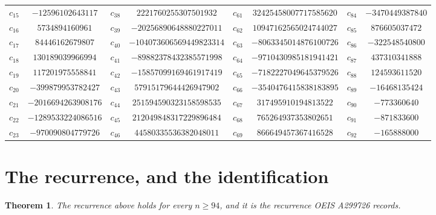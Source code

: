 \documentclass[11pt,a4paper]{article}
\theoremstyle{plain}
\newtheorem{theorem}{Theorem}
\theoremstyle{definition}
\begin{document}
\begin{center}
\begin{tabular}{cccccccc}
$c_{15}$ & $-12596102643117$ & $c_{38}$ & $2221760255307501932$ & $c_{61}$ & $32425458007717585620$ & $c_{84}$ & $-3470449387840$ \\
$c_{16}$ & $5734894160961$ & $c_{39}$ & $-20256890648880227011$ & $c_{62}$ & $10947162565024744027$ & $c_{85}$ & $876605037472$ \\
$c_{17}$ & $84446162679807$ & $c_{40}$ & $-104073606569449823314$ & $c_{63}$ & $-8063345014876100726$ & $c_{86}$ & $-322548540800$ \\
$c_{18}$ & $130189039966994$ & $c_{41}$ & $-89882378432385571998$ & $c_{64}$ & $-9710430985181941421$ & $c_{87}$ & $437310341888$ \\
$c_{19}$ & $117201975558841$ & $c_{42}$ & $-15857099169461917419$ & $c_{65}$ & $-7182227049645379526$ & $c_{88}$ & $124593611520$ \\
$c_{20}$ & $-399879953782427$ & $c_{43}$ & $57915179644426947902$ & $c_{66}$ & $-3540476415838183895$ & $c_{89}$ & $-16468135424$ \\
$c_{21}$ & $-2016694263908176$ & $c_{44}$ & $251594590323158598535$ & $c_{67}$ & $317495910194813522$ & $c_{90}$ & $-773360640$ \\
$c_{22}$ & $-1289533224086516$ & $c_{45}$ & $212049848317229896484$ & $c_{68}$ & $765264937353802651$ & $c_{91}$ & $-871833600$ \\
$c_{23}$ & $-970090804779726$ & $c_{46}$ & $44580335536382048011$ & $c_{69}$ & $866649457367416528$ & $c_{92}$ & $-165888000$ \\
\end{tabular}
\end{center}

\section{The recurrence, and the identification}

\begin{theorem}
The recurrence above holds for every $n\ge94$, and it is the recurrence OEIS A299726 records.
\end{theorem}
\end{document}
